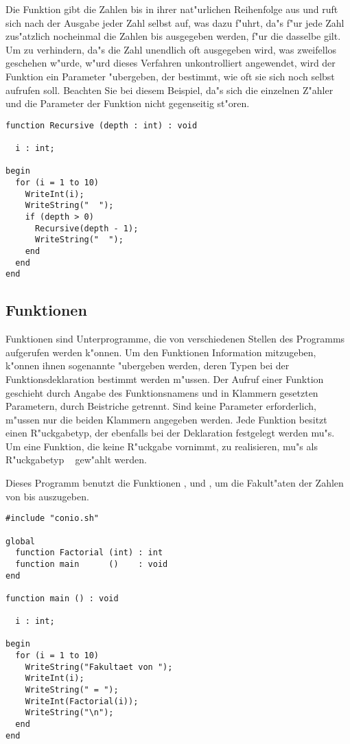 \example
Die Funktion 
gibt die Zahlen  bis  in
ihrer nat"urlichen Reihenfolge aus und ruft sich nach der
Ausgabe jeder Zahl selbst auf, was dazu f"uhrt, da"s f"ur jede
Zahl zus"atzlich nocheinmal die Zahlen  bis 
ausgegeben werden, f"ur die dasselbe gilt. Um zu verhindern, da"s
die Zahl  unendlich oft ausgegeben wird, was zweifellos
geschehen w"urde, w"urd dieses Verfahren unkontrolliert
angewendet, wird der Funktion ein Parameter "ubergeben, der
bestimmt, wie oft sie sich noch selbst aufrufen soll.
Beachten Sie bei diesem Beispiel, da"s sich die einzelnen Z"ahler
 und die Parameter  der Funktion nicht gegenseitig
st"oren.

\begin{verbatim}
function Recursive (depth : int) : void

  i : int;

begin
  for (i = 1 to 10)
    WriteInt(i);
    WriteString("  ");
    if (depth > 0)
      Recursive(depth - 1);
      WriteString("  ");
    end
  end
end
\end{verbatim}

\subsection{Funktionen}

Funktionen sind Unterprogramme, die von verschiedenen Stellen des
Programms aufgerufen werden k"onnen. Um den Funktionen
Information mitzugeben, k"onnen ihnen sogenannte {\em {}}
"ubergeben werden, deren Typen bei der Funktionsdeklaration
bestimmt werden m"ussen. Der Aufruf einer Funktion geschieht
durch Angabe des Funktionsnamens und in Klammern gesetzten
Parametern,
durch Beistriche getrennt. Sind keine Parameter
erforderlich, m"ussen nur die
beiden Klammern angegeben werden. Jede Funktion besitzt einen
R"uckgabetyp, der
ebenfalls bei der Deklaration festgelegt werden mu"s. Um eine
Funktion, die keine R"uckgabe vornimmt, zu realisieren, mu"s als
R"uckgabetyp \tvoid\
gew"ahlt werden.

\example
Dieses Programm benutzt die Funktionen ,
 und , um die Fakult"aten
der Zahlen von  bis  auszugeben.

\begin{verbatim}
#include "conio.sh"

global
  function Factorial (int) : int
  function main      ()    : void
end

function main () : void

  i : int;

begin
  for (i = 1 to 10)
    WriteString("Fakultaet von ");
    WriteInt(i);
    WriteString(" = ");
    WriteInt(Factorial(i));
    WriteString("\n");
  end
end
\end{verbatim}

